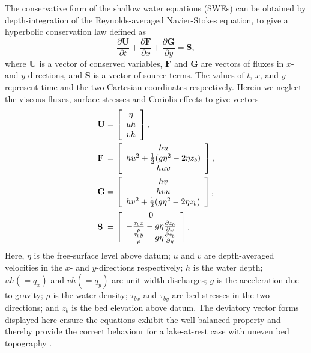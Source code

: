 The conservative form of the shallow water equations (SWEs) can be obtained by depth-integration of the Reynolds-averaged Navier-Stokes equation, to give a hyperbolic conservation law defined as
\begin{equation}
	\label{SWE}
	\frac{\partial\textbf{U}}{\partial t} +
	\frac{\partial\textbf{F}}{\partial x} +
	\frac{\partial\textbf{G}}{\partial y} =
	\textbf{S} ,
\end{equation}
where \(\textbf{U}\) is a vector of conserved variables, \(\textbf{F}\) and \(\textbf{G}\) are vectors of fluxes in \(x\)- and \(y\)-directions, and \(\textbf{S}\) is a vector of source terms. The values of \(t\), \(x\), and \(y\) represent time and the two Cartesian coordinates respectively. Herein we neglect the viscous fluxes, surface stresses and Coriolis effects to give vectors
\renewcommand{\arraystretch}{1.5}
\begin{equation}
	\label{SWETerms}
	\begin{alignedat}{2}
		&\textbf U && = \left[ \begin{array}{c}
			\eta \\
			uh \\
			vh
		\end{array} \right] ,\\
		&\textbf F &&  = \left[ \begin{array}{c}
			hu \\
			hu^2 + \frac{1}{2}(g\eta^2 - 2\eta z_b) \\
			huv
		\end{array} \right] ,\\
		&\textbf G && = \left[ \begin{array}{c}
			hv \\
			hvu \\
			hv^2 + \frac{1}{2}(g\eta^2 - 2\eta z_b) \\
		\end{array} \right] ,\\
		&\textbf S && = \left[ \begin{array}{c}
			0 \\
			-\frac{\tau_bx}{\rho} - g\eta \frac{\partial z_b}{\partial x} \\
			-\frac{\tau_by}{\rho} - g\eta \frac{\partial z_b}{\partial y} \\
		\end{array} \right] .
	\end{alignedat}
\end{equation}
Here, \(\eta\) is the free-surface level above datum; \(u\) and \(v\) are depth-averaged velocities in the \(x\)- and \(y\)-directions respectively; \(h\) is the water depth; \(uh (=q_x)\) and \(vh (=q_y)\) are unit-width discharges; \(g\) is the acceleration due to gravity; \(\rho\) is the water density; \(\tau_{bx}\) and \(\tau_{by}\) are bed stresses in the two directions; and \(z_b\) is the bed elevation above datum. The deviatory vector forms displayed here ensure the equations exhibit the well-balanced property and thereby provide the correct behaviour for a lake-at-rest case with uneven bed topography \citep{Liang2009c}.

